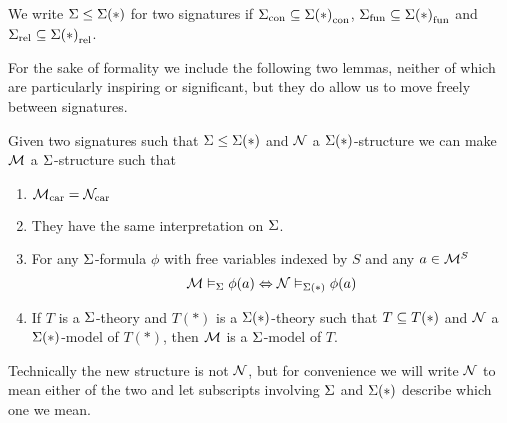\begin{nttn}
    We write $\Sigma \leq \Sigma(*)$ for two signatures if
    ${\Sigma}_\mathrm{con} \subseteq {\Sigma(*)}_\mathrm{con}$,
    ${\Sigma}_\mathrm{fun} \subseteq {\Sigma(*)}_\mathrm{fun}$ and ${\Sigma}_\mathrm{rel} \subseteq {\Sigma(*)}_\mathrm{rel}$.
\end{nttn}

For the sake of formality we include the following two lemmas, 
neither of which are particularly inspiring or significant,
but they do allow us to move freely between signatures.
\begin{lem}
    Given two signatures such that 
    $\Sigma \leq \Sigma(*)$ and
    $\mathcal{N}$ a $\Sigma(*)$-structure we can make 
    $\mathcal{M}$ a $\Sigma$-structure such that
    \begin{enumerate}
        \item ${\mathcal{M}}_\mathrm{car} = {\mathcal{N}}_\mathrm{car}$
        \item They have the same interpretation on $\Sigma$.
        \item For any $\Sigma$-formula $\phi$ with free variables indexed by $S$
            and any $a \in \mathcal{M}^S$
            \[\mathcal{M} \vDash_{\Sigma} \phi(a) \Leftrightarrow \mathcal{N} \vDash_{\Sigma(*)} \phi(a)\]
        \item If $T$ is a $\Sigma$-theory and $T(*)$ is a $\Sigma(*)$-theory 
            such that $T \subseteq T(*)$ and $\mathcal{N}$ a $\Sigma(*)$-model of $T(*)$,
            then $\mathcal{M}$ is a $\Sigma$-model of $T$.
    \end{enumerate}
    Technically the new structure is not $\mathcal{N}$,
    but for convenience we will write 
    $\mathcal{N}$ to mean either of the two and let subscripts involving 
    $\Sigma$ and $\Sigma(*)$ describe which one we mean.
\end{lem}
